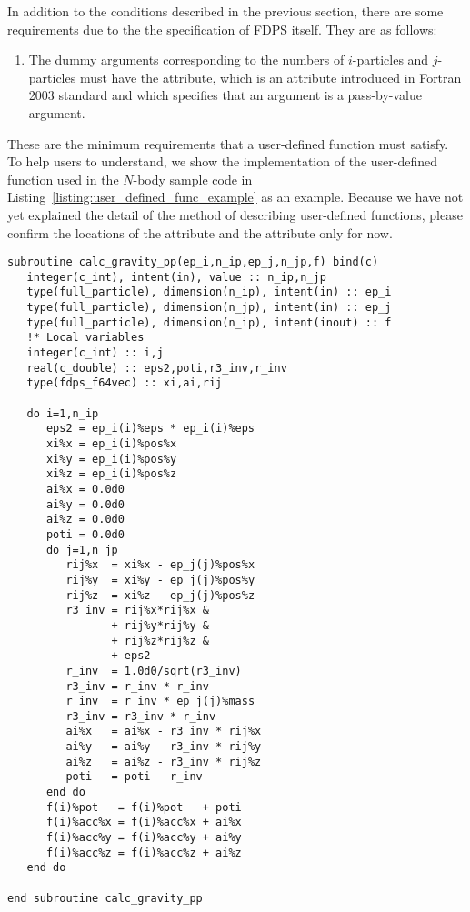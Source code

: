 In addition to the conditions described in the previous section, there are some requirements due to the the specification of FDPS itself. They are as follows:
\begin{enumerate}[leftmargin=*,itemsep=-1ex,label=(\arabic*),resume]
\item The dummy arguments corresponding to the numbers of $i$-particles and $j$-particles must have the  attribute, which is an attribute introduced in Fortran 2003 standard and which specifies that an argument is a pass-by-value argument. 
\end{enumerate}

These are the minimum requirements that a user-defined function must satisfy. To help users to understand, we show the implementation of the user-defined function used in the $N$-body sample code in Listing~\ref{listing:user_defined_func_example} as an example. Because we have not yet explained the detail of the method of describing user-defined functions, please confirm the locations of the  attribute and the  attribute only for now. 

\begin{lstlisting}[caption=An example of the implementation of an user-defined function defining particle-particle interaction in $N$-body simulation,label=listing:user_defined_func_example]
subroutine calc_gravity_pp(ep_i,n_ip,ep_j,n_jp,f) bind(c)
   integer(c_int), intent(in), value :: n_ip,n_jp
   type(full_particle), dimension(n_ip), intent(in) :: ep_i
   type(full_particle), dimension(n_jp), intent(in) :: ep_j
   type(full_particle), dimension(n_ip), intent(inout) :: f
   !* Local variables
   integer(c_int) :: i,j
   real(c_double) :: eps2,poti,r3_inv,r_inv
   type(fdps_f64vec) :: xi,ai,rij
      
   do i=1,n_ip
      eps2 = ep_i(i)%eps * ep_i(i)%eps
      xi%x = ep_i(i)%pos%x
      xi%y = ep_i(i)%pos%y
      xi%z = ep_i(i)%pos%z
      ai%x = 0.0d0
      ai%y = 0.0d0
      ai%z = 0.0d0
      poti = 0.0d0
      do j=1,n_jp
         rij%x  = xi%x - ep_j(j)%pos%x
         rij%y  = xi%y - ep_j(j)%pos%y
         rij%z  = xi%z - ep_j(j)%pos%z
         r3_inv = rij%x*rij%x &
                + rij%y*rij%y &
                + rij%z*rij%z &
                + eps2
         r_inv  = 1.0d0/sqrt(r3_inv)
         r3_inv = r_inv * r_inv
         r_inv  = r_inv * ep_j(j)%mass
         r3_inv = r3_inv * r_inv
         ai%x   = ai%x - r3_inv * rij%x
         ai%y   = ai%y - r3_inv * rij%y
         ai%z   = ai%z - r3_inv * rij%z
         poti   = poti - r_inv
      end do
      f(i)%pot   = f(i)%pot   + poti
      f(i)%acc%x = f(i)%acc%x + ai%x
      f(i)%acc%y = f(i)%acc%y + ai%y
      f(i)%acc%z = f(i)%acc%z + ai%z
   end do

end subroutine calc_gravity_pp
\end{lstlisting}


